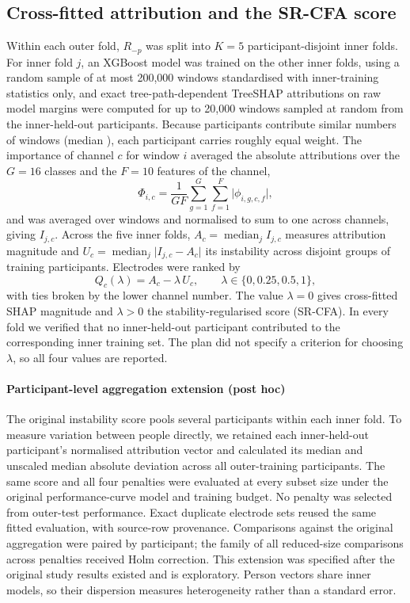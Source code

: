 \subsection{Cross-fitted attribution and the SR-CFA score}
Within each outer fold, $R_{-p}$ was split into $K = 5$ participant-disjoint inner folds. For inner fold $j$, an XGBoost model was trained on the other inner folds, using a random sample of at most 200,000 windows standardised with inner-training statistics only, and exact tree-path-dependent TreeSHAP attributions on raw model margins \citep{lundberg2020local} were computed for up to 20,000 windows sampled at random from the inner-held-out participants. Because participants contribute similar numbers of windows (median \TestWindowsPerParticipant), each participant carries roughly equal weight. The importance of channel $c$ for window $i$ averaged the absolute attributions over the $G = 16$ classes and the $F = 10$ features of the channel,
\begin{equation}
\Phi_{i,c} = \frac{1}{G F}\sum_{g=1}^{G}\sum_{f=1}^{F} \lvert \phi_{i,g,c,f} \rvert ,
\end{equation}
and was averaged over windows and normalised to sum to one across channels, giving $I_{j,c}$. Across the five inner folds, $A_c = \operatorname{median}_j I_{j,c}$ measures attribution magnitude and $U_c = \operatorname{median}_j \lvert I_{j,c} - A_c \rvert$ its instability across disjoint groups of training participants. Electrodes were ranked by
\begin{equation}
Q_c(\lambda) = A_c - \lambda\, U_c , \qquad \lambda \in \{0, 0.25, 0.5, 1\},
\label{eq:srcfa}
\end{equation}
with ties broken by the lower channel number. The value $\lambda = 0$ gives cross-fitted SHAP magnitude and $\lambda > 0$ the stability-regularised score (SR-CFA). In every fold we verified that no inner-held-out participant contributed to the corresponding inner training set. The plan did not specify a criterion for choosing $\lambda$, so all four values are reported.

\paragraph{Participant-level aggregation extension (post hoc)}
The original instability score pools several participants within each inner fold. To measure variation between people directly, we retained each inner-held-out participant's normalised attribution vector and calculated its median and unscaled median absolute deviation across all outer-training participants. The same score and all four penalties were evaluated at every subset size under the original performance-curve model and training budget. No penalty was selected from outer-test performance. Exact duplicate electrode sets reused the same fitted evaluation, with source-row provenance. Comparisons against the original aggregation were paired by participant; the family of all reduced-size comparisons across penalties received Holm correction. This extension was specified after the original study results existed and is exploratory. Person vectors share inner models, so their dispersion measures heterogeneity rather than a standard error.

